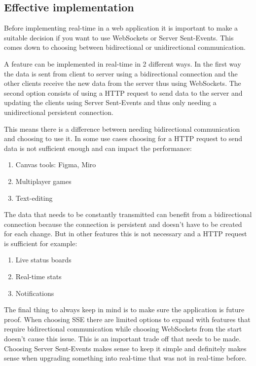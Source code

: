 \newpage

\subsection{Effective implementation}

Before implementing real-time in a web application it is important to make a suitable decision if you want to use WebSockets or Server Sent-Events. This comes down to choosing between bidirectional or unidirectional communication.

A feature can be implemented in real-time in 2 different ways. In the first way the data is sent from client to server using a bidirectional connection and the other clients receive the new data from the server thus using WebSockets. The second option consists of using a HTTP request to send data to the server and updating the clients using Server Sent-Events and thus only needing a unidirectional persistent connection.

This means there is a difference between needing bidirectional communication and choosing to use it. In some use cases choosing for a HTTP request to send data is not sufficient enough and can impact the performance:

\begin{enumerate}
  \item Canvas tools: Figma, Miro
  \item Multiplayer games
  \item Text-editing
\end{enumerate}

The data that needs to be constantly transmitted can benefit from a bidirectional connection because the connection is persistent and doesn't have to be created for each change. But in other features this is not necessary and a HTTP request is sufficient for example:

\begin{enumerate}
  \item Live status boards
  \item Real-time stats
  \item Notifications
\end{enumerate}

The final thing to always keep in mind is to make sure the application is future proof. When choosing SSE there are limited options to expand with features that require bidirectional communication while choosing WebSockets from the start doesn't cause this issue. This is an important trade off that needs to be made. Choosing Server Sent-Events makes sense to keep it simple and definitely makes sense when upgrading something into real-time that was not in real-time before.

